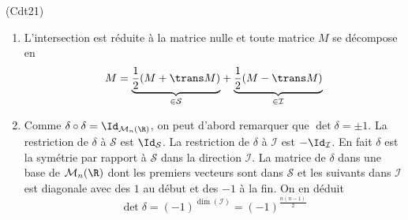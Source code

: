 \begin{tiny}(Cdt21)\end{tiny}
\begin{enumerate}
 \item L'intersection est réduite à la matrice nulle et toute matrice $M$ se décompose en
\begin{displaymath}
 M = \underset{\in \mathcal{S}}{\underbrace{\frac{1}{2}(M+\trans M)}}+ \underset{\in \mathcal{I}}{\underbrace{\frac{1}{2}(M-\trans M)}}
\end{displaymath}

 \item Comme $\delta \circ \delta=\Id_{\mathcal{M}_n(\R)}$, on peut d'abord remarquer que $\det \delta =\pm 1$. La restriction de $\delta$ à $\mathcal S$ est $\Id_{\mathcal S}$.  La restriction de $\delta$ à $\mathcal I$ est $-\Id_{\mathcal I}$. En fait $\delta$ est la symétrie par rapport à $\mathcal{S}$ dans la direction $\mathcal{I}$. La matrice de $\delta$ dans une base de $\mathcal{M}_n(\R)$ dont les premiers vecteurs sont dans $\mathcal{S}$ et les suivants dans $\mathcal{I}$ est diagonale avec des $1$ au début et des $-1$ à la fin. On en déduit
\begin{displaymath}
\det \delta = (-1)^{\dim(\mathcal{I})}=(-1)^{\frac{n(n-1)}{2}} 
\end{displaymath}
\end{enumerate}